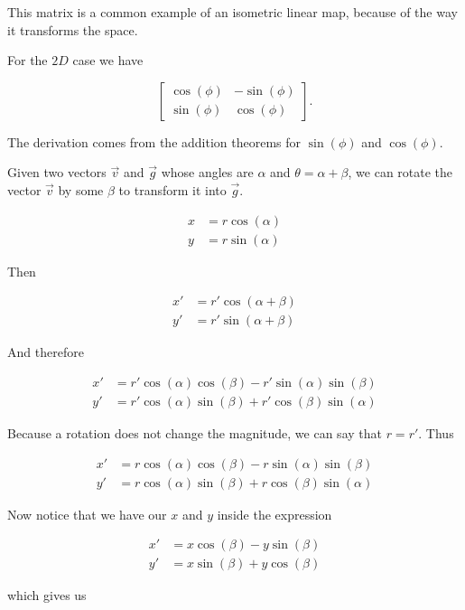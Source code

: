 This matrix is a common example of an isometric linear map, because of the way it transforms the space.

For the \(2D\) case we have 

\[
    \begin{bmatrix}
        \cos(\phi) & -\sin(\phi)\\
        \sin(\phi) & \cos(\phi)
    \end{bmatrix}.
\]

The derivation comes from the addition theorems for \(\sin(\phi) \) and \(\cos(\phi)\).

Given two vectors \(\vec{v}\) and \(\vec{g}\) whose angles are \(\alpha\) and \(\theta = \alpha + \beta\), 
we can rotate the vector \(\vec{v}\) by some \(\beta\) to transform it into \(\vec{g}\).

\begin{align*}
    x &= r \cos(\alpha)\\
    y &= r \sin(\alpha)
\end{align*}

Then 

\begin{align*}
    x' &= r' \cos(\alpha + \beta)\\
    y' &= r' \sin(\alpha + \beta)
\end{align*}

And therefore

\begin{align*}
    x' &= r' \cos(\alpha)\cos(\beta) - r'\sin(\alpha)\sin(\beta)\\
    y' &= r' \cos(\alpha)\sin(\beta) + r'\cos(\beta)\sin(\alpha)
\end{align*}

Because a rotation does not change the magnitude, we can say that \(r = r'\). Thus 

\begin{align*}
    x' &= r \cos(\alpha)\cos(\beta) - r\sin(\alpha)\sin(\beta)\\
    y' &= r \cos(\alpha)\sin(\beta) + r\cos(\beta)\sin(\alpha)
\end{align*}

Now notice that we have our \(x\) and \(y\) inside the expression

\begin{align*}
    x' &= x\cos(\beta) - y\sin(\beta)\\
    y' &= x\sin(\beta) + y\cos(\beta)
\end{align*}

which gives us 

